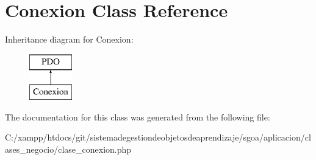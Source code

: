 \hypertarget{class_conexion}{}\section{Conexion Class Reference}
\label{class_conexion}
Inheritance diagram for Conexion\+:\begin{figure}[H]
\begin{center}
\leavevmode
\includegraphics[height=2.000000cm]{class_conexion}
\end{center}
\end{figure}


The documentation for this class was generated from the following file\+:\begin{DoxyCompactItemize}
\item 
C\+:/xampp/htdocs/git/sistemadegestiondeobjetosdeaprendizaje/sgoa/aplicacion/clases\+\_\+negocio/clase\+\_\+conexion.\+php\end{DoxyCompactItemize}
